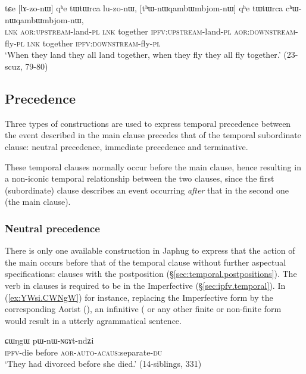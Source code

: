 \begin{exe}
\ex \label{ex:tWtWrca.luzonW2}
\gll tɕe [lɤ-zo-nɯ] qʰe tɯtɯrca lu-zo-nɯ, [tʰɯ-nɯqambɯmbjom-nɯ] qʰe tɯtɯrca cʰɯ-nɯqambɯmbjom-nɯ, \\
\textsc{lnk} \textsc{aor}:\textsc{upstream}-land-\textsc{pl}  \textsc{lnk} together  \textsc{ipfv}:\textsc{upstream}-land-\textsc{pl} \textsc{aor}:\textsc{downstream}-fly-\textsc{pl}  \textsc{lnk} together  \textsc{ipfv}:\textsc{downstream}-fly-\textsc{pl} \\
\glt `When they land they all land together, when they fly they all fly together.' (23-scuz, 79-80)
\end{exe}
 
 
\subsection{Precedence}
Three types of constructions are used to express temporal precedence between the event described in the main clause precedes that of the temporal subordinate clause: neutral precedence, immediate precedence and terminative. 

These temporal clauses normally occur before the main clause, hence resulting in a non-iconic temporal relationship between the two clauses, since the first (subordinate) clause describes an event occurring \textit{after} that in the second one (the main clause).

 \subsubsection{Neutral precedence} \label{sec:precedence.CWNgW}
There is only one available construction in Japhug to express that the action of the main occurs before that of the temporal clause without further aspectual specifications: clauses with the postposition  (§\ref{sec:temporal.postpositions}). The verb in  clauses is required to be in the Imperfective (§\ref{sec:ipfv.temporal}). In (\ref{ex:YWsi.CWNgW}) for instance, replacing the Imperfective form  by the corresponding Aorist (), an infinitive ( or any other finite or non-finite form would result in a utterly agrammatical sentence.

\begin{exe}
\ex \label{ex:YWsi.CWNgW}
\gll [ɲɯ-si] ɕɯŋgɯ pɯ-nɯ-ɴɢɤt-ndʑi  \\
\textsc{ipfv}-die before \textsc{aor}-\textsc{auto}-\textsc{acaus}:separate-\textsc{du} \\
\glt `They had divorced before she died.' (14-siblings, 331)
\end{exe}

